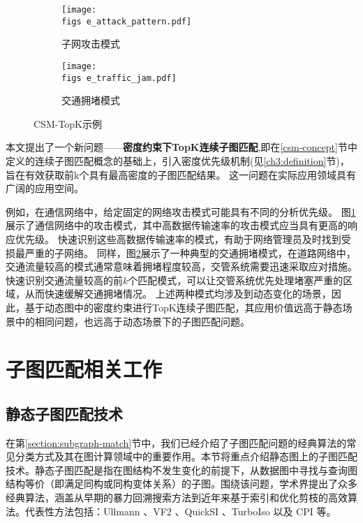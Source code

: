 \begin{figure}[h!]
    \def\wscorevone{0.49}
    \centering
        \begin{subfigure}[t]{\wscorevone\linewidth}
            \centering
            \resizebox{\linewidth}{!}
            {
                \texttt{[image: \\figs e\_attack\_pattern.pdf]}
            }
            \caption{子网攻击模式~\cite{static-topk-Gupta-DBLP:conf/icde/GuptaGYCH14}}
            \label{fig:example_attack_pattern}
        \end{subfigure}
        \hfill
        \begin{subfigure}[t]{\wscorevone\linewidth}
            \centering
            \resizebox{\linewidth}{!}
            {
                \texttt{[image: \\figs e\_traffic\_jam.pdf]}
            }
            \caption{交通拥堵模式~\cite{traffic-graph-matching-DBLP:journals/pvldb/SongGCW14}}
            \label{fig:example_traffic_jam}
        \end{subfigure}
        \label{fig:definition}
        \caption{CSM-TopK示例}
    \end{figure}

本文提出了一个新问题——\textbf{密度约束下TopK连续子图匹配},即在\ref{csm-concept}节中定义的连续子图匹配概念的基础上，引入密度优先级机制(见\ref{ch3:definition}节)，旨在有效获取前k个具有最高密度的子图匹配结果。
这一问题在实际应用领域具有广阔的应用空间。

例如，在通信网络中，给定固定的网络攻击模式可能具有不同的分析优先级。
图\ref{fig:example_attack_pattern}展示了通信网络中的攻击模式\cite{static-topk-Gupta-DBLP:conf/icde/GuptaGYCH14}，其中高数据传输速率的攻击模式应当具有更高的响应优先级。
快速识别这些高数据传输速率的模式，有助于网络管理员及时找到受损最严重的子网络。
同样，图\ref{fig:example_traffic_jam}展示了一种典型的交通拥堵模式\cite{traffic-graph-matching-DBLP:journals/pvldb/SongGCW14}，在道路网络中，交通流量较高的模式通常意味着拥堵程度较高，交管系统需要迅速采取应对措施。
快速识别交通流量较高的前$k$个匹配模式，可以让交管系统优先处理堵塞严重的区域，从而快速缓解交通拥堵情况。
上述两种模式均涉及到动态变化的场景，因此，基于动态图中的密度约束进行TopK连续子图匹配，其应用价值远高于静态场景中的相同问题，也远高于动态场景下的子图匹配问题。

\section{子图匹配相关工作}
\subsection{静态子图匹配技术}
在第\ref{section:subgraph-match}节中，我们已经介绍了子图匹配问题的经典算法的常见分类方式及其在图计算领域中的重要作用。本节将重点介绍静态图上的子图匹配技术。静态子图匹配是指在图结构不发生变化的前提下，从数据图中寻找与查询图结构等价（即满足同构或同构变体关系）的子图。围绕该问题，学术界提出了众多经典算法，涵盖从早期的暴力回溯搜索方法到近年来基于索引和优化剪枝的高效算法。代表性方法包括：Ullmann  \cite{sm-ullmann-DBLP:journals/jacm/Ullmann76}、VF2  \cite{sm-vf2-2004}、QuickSI \cite{sm-quicksi-shang2008taming}、TurboIso \cite{sm-turbo-iso-DBLP:conf/sigmod/HanLL13} 以及 CPI \cite{sm-CPI-bi2016efficient} 等。

